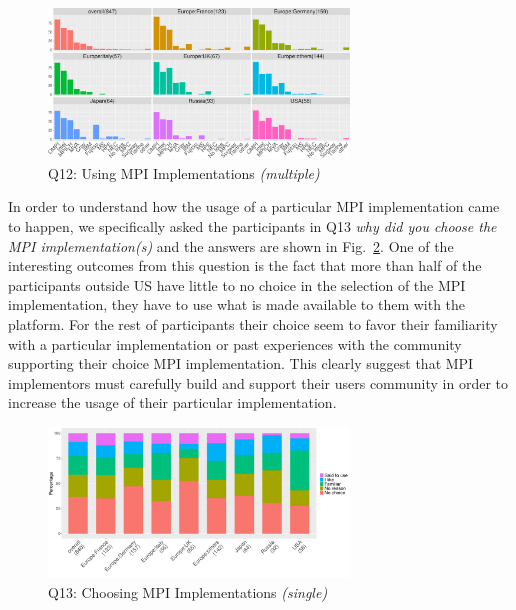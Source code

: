 \documentclass[preprint,5p,times]{elsarticle}
\def\myquote#1{{\it #1}}
\begin{document}
  \begin{figure}[htb]
    \begin{center}
      \includegraphics[width=8.0cm]{R-scripts/Q12.pdf}
    \vspace{-2mm}
      \caption{Q12: Using MPI Implementations {\it(multiple)}}
      \label{fig:using-implementations}
    \end{center}
  \end{figure}

In order to understand how the usage of a particular MPI implementation came to
happen, we specifically asked the participants in Q13 \myquote{why did you
choose the MPI implementation(s)} and the answers are shown in
Fig.~\ref{fig:choosing-implementation}.
%
One of the interesting outcomes from this question is the fact that more than
half of the participants outside US have little to no choice in the selection of
the MPI implementation, they have to use what is made available to them with the
platform. For the rest of participants their choice seem to favor their
familiarity with a particular implementation or past experiences with the
community supporting their choice MPI implementation.
%
This clearly suggest that MPI implementors must carefully build and support
their users community in order to increase the usage of their particular
implementation.


  \begin{figure}[htb]
    \begin{center}
      \includegraphics[width=8.0cm]{R-scripts/Q13.pdf}
      \vspace{-2mm}
      \caption{Q13: Choosing MPI Implementations {\it(single)}}
      \label{fig:choosing-implementation}
    \end{center}
  \end{figure}
\end{document}

